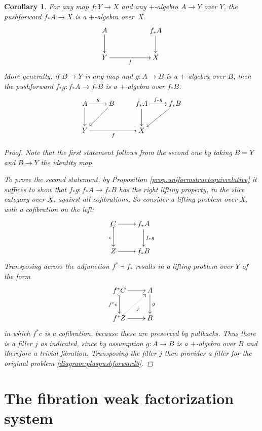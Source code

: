 \documentclass[12pt]{article}
\newcommand{\ra}{\ensuremath{\rightarrow}}
\newtheorem{corollary}[theorem]{Corollary}
\theoremstyle{remark}
\theoremstyle{definition}
\begin{document}
\begin{corollary}\label{cor:plusalgpushforward} 
For any map $f:Y\ra X$ and any $+$-algebra $A\ra Y$ over $Y$,  the pushforward $f_*A \ra X$ is a $+$-algebra over~$X$.  
\begin{equation}\label{diagram:pluspushforward1}
\xymatrix{
A \ar[d]  & & f_*A \ar[d]  \\
Y \ar[rr]_f && X
}
\end{equation}
More generally, if $B\ra Y$ is any map and $g:A\ra B$ is a $+$-algebra over $B$, then the pushforward $f_*g: f_*A \ra f_*B$ is a $+$-algebra   over $f_*B$. 
\begin{equation}\label{diagram:pluspushforward2}
\xymatrix{
A \ar[d] \ar[r]^{g} & B \ar[ld] & f_*A \ar[d] \ar[r]^{f_*g} & f_*B  \ar[ld] \\
Y \ar[rr]_f && X &
}
\end{equation}
\begin{proof}
Note that the first statement follows from the second one by taking $B=Y$ and $B\ra Y$ the identity map.

To prove the second statement, by Proposition \ref{prop:uniformstructequivrelative} it suffices to show that $f_*g: f_*A \ra f_*B$ has the right lifting property, in the slice category over $X$, against all cofibrations.  So consider a lifting problem over $X$, with a cofibration on the left:
\begin{equation}\label{diagram:pluspushforward3}
\xymatrix{
C \ar@{>->}[d]_c  \ar[r]  & f_*A \ar[d]^{f_*g}  \\
Z \ar[r] & f_*B
}
\end{equation}
Transposing across the adjunction $f^*\dashv f_*$ results in a lifting problem over $Y$ of the form
\begin{equation*}%
\xymatrix{
f^*C \ar@{>->}[d]_{f^*c}  \ar[r]  & A \ar[d]^{g}  \\
f^*Z \ar[r] \ar@{..>}_j[ru] & B
}
\end{equation*}
in which $f^*c$ is a cofibration, because these are preserved by pullbacks.  Thus there is a filler $j$ as indicated, since by assumption $g:A\ra B$ is a $+$-algebra over $B$ and therefore a trivial fibration.  Transposing the filler $j$ then provides a filler for the original problem \eqref{diagram:pluspushforward3}.
\end{proof}
\end{corollary}

\section{The fibration weak factorization system}\label{FWFS}
\end{document}
